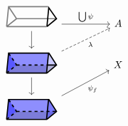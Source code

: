 \[\begin{tikzcd}
	\begin{tikzpicture}[x=2em, y=2em]
    \draw[very thick, black!50]
        (0,0)--(2,0)
        (2.075,1)--(0.1,1)--(0,0)
        (0,0)--(0.5,0.4)--(0.1,1)
        (0.5,0.4)--(2.5,0.4);
	\draw[very thick] (2.02,0)--(2.5,0.4)--(2.11,0.95)--(2.02,0);
    \end{tikzpicture}
	 && A \\
	\begin{tikzpicture}[x=2em, y=2em,baseline=0.5em]
    \begin{scope}[very thick]
    \fill[fill=blue, opacity=0.3]
        (0,0)--(2,0)--(2.1,1)--(0.1,1)--(0,0);
    \fill[fill=blue!50!black, opacity=0.3]
        (0,0)--(0.5,0.4)--(2.5,0.4)--(2,0)--(0,0);
    \fill[fill=blue, opacity=0.2]
        (0.1,1)--(0.5,0.4)--(2.5,0.4)--(2.1,1)--(0.1,1);
    \fill[fill=blue, opacity=0.5]
        (0.1,1)--(0.5,0.4)--(0,0)--(0.1,1);
    \draw
        (0,0)--(2,0)--(2.1,1)--(0.1,1)--(0,0)
        (2.02,0)--(2.5,0.4)--(2.117,1.001)
        (2.05,0.4)--(2.5,0.4);
    \draw[dashed]
        (0,0)--(0.5,0.4)--(0.1,1)
        (0.5,0.4)--(2.05,0.4);
    \end{scope}
    \end{tikzpicture}
    && X \\
	\begin{tikzpicture}[x=2em, y=2em,baseline=0.5em]
    \begin{scope}[very thick]
    \fill[fill=blue, opacity=0.3]
        (0,0)--(2,0)--(2.1,1)--(0.1,1)--(0,0);
    \fill[fill=blue!50!black, opacity=0.3]
        (0,0)--(0.5,0.4)--(2.5,0.4)--(2,0)--(0,0);
    \fill[fill=blue, opacity=0.2]
        (0.1,1)--(0.5,0.4)--(2.5,0.4)--(2.1,1)--(0.1,1);
    \fill[fill=blue, opacity=0.5]
        (0.1,1)--(0.5,0.4)--(0,0)--(0.1,1);
    \fill[fill=blue, opacity=0.4]
        (2,0)--(2.5,0.4)--(2.1,1);
    \draw
        (0,0)--(2,0)--(2.1,1)--(0.1,1)--(0,0)
        (2.02,0)--(2.5,0.4)--(2.117,1.001);
    \draw[dashed]
        (0,0)--(0.5,0.4)--(0.1,1)
        (0.5,0.4)--(2.5,0.4);
    \end{scope}
    \end{tikzpicture}
	\arrow["\bigcup\psi", from=1-1, to=1-3]
	\arrow[from=1-1, to=2-1]
	\arrow[from=2-1, to=3-1]
	\arrow["{\psi_f}"', from=3-1, to=2-3]
	\arrow["\lambda"', dashed, from=2-1, to=1-3]
\end{tikzcd}\]